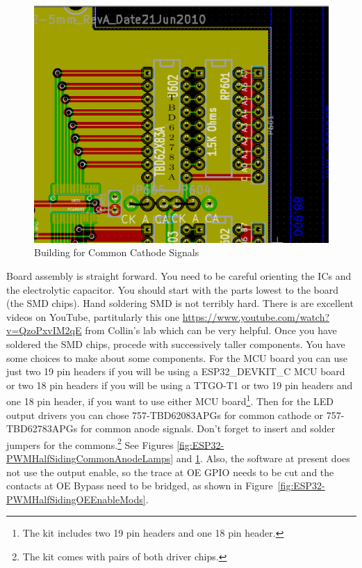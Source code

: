 \begin{figure}[hbpt]\begin{centering}%
\includegraphics[width=5in]{ESP32-PWMHalfSidingCommonCathodeLamps.png}
\caption{Building for Common Cathode Signals}
\label{fig:ESP32-PWMHalfSidingCommonCathodeLamps}
\end{centering}\end{figure} 
Board assembly is straight forward. You need to be careful orienting the ICs
and the electrolytic capacitor. You should start with the parts lowest to the
board (the SMD chips). Hand soldering SMD is not terribly hard. There is are
excellent videos on YouTube, partitularly this one
\url{https://www.youtube.com/watch?v=QzoPxvIM2qE} from Collin's lab which can
be very helpful. Once you have soldered the SMD chips, procede with
successively taller components. You have some choices to make about some
components. For the MCU board you can use just two 19 pin headers if you will
be using a ESP32\_DEVKIT\_C MCU board or two 18 pin headers if you will be
using a TTGO-T1 or two 19 pin headers and one 18 pin header, if you want to
use either MCU board\footnote{The kit includes two 19 pin headers and one 18
pin header.}. Then for the LED output drivers you can chose 757-TBD62083APGs
for common cathode or 757-TBD62783APGs for common anode signals. Don't forget
to insert and solder jumpers for the commons.\footnote{The kit comes with
pairs of both driver chips.}  See Figures 
\ref{fig:ESP32-PWMHalfSidingCommonAnodeLamps} and 
\ref{fig:ESP32-PWMHalfSidingCommonCathodeLamps}. Also, the software at present does not use the 
output enable, so the trace at OE GPIO needs to be cut and the contacts at OE 
Bypass need to be bridged, as shown in 
Figure~\ref{fig:ESP32-PWMHalfSidingOEEnableMods}.

